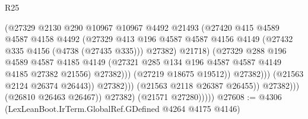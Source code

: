 \begin{lexlean}{R25}
\begin{coremodule}
                                          (@27329
                                            @2130
                                            @290
                                            @10967
                                            @10967
                                            @4492
                                            @21493
                                            (@27420
                                              @415
                                              @4589
                                              @4587
                                              @4158
                                              @4492
                                              (@27329
                                                @413
                                                @196
                                                @4587
                                                @4587
                                                @4156
                                                @4149
                                                (@27432 @335 @4156 (@4738 (@27435 @335)))
                                                @27382)
                                              @21718)
                                            (@27329
                                              @288
                                              @196
                                              @4589
                                              @4587
                                              @4185
                                              @4149
                                              (@27321
                                                @285
                                                @134
                                                @196
                                                @4587
                                                @4587
                                                @4149
                                                @4185
                                                @27382
                                                @21556)
                                              @27382)))
                                        (@27219 @18675 @19512))
                                      @27382)))
                                (@21563 @2124 @26374 @26443))
                              @27382)))
                        (@21563 @2118 @26387 @26455))
                      @27382)))
                (@26810 @26463 @26467))
              @27382)
            (@21571 @27280)))))
@27608 := @4306 (LexLeanBoot.IrTerm.GlobalRef.GDefined @4264 @4175 @4146)

\end{coremodule}
\end{lexlean}
